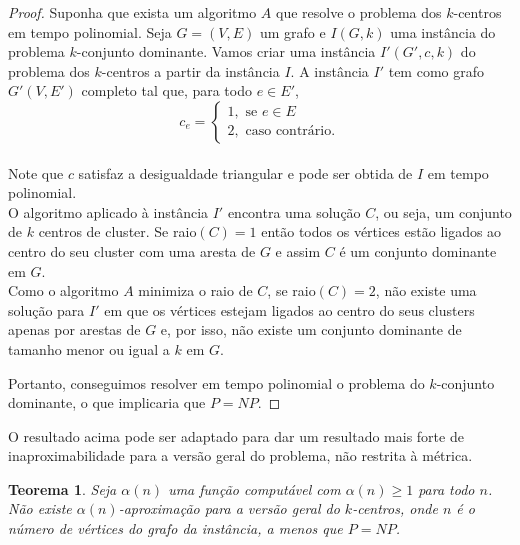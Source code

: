 \documentclass[12pt]{article}
\newtheorem{theorem}{Teorema}[section]
\newcommand{\NP}{\mathit{NP}}
\begin{document}
\begin{proof}
    Suponha que exista um algoritmo $A$ que resolve o problema dos $k$-centros em tempo polinomial. Seja $G = (V,E)$ um grafo e $I(G,k)$ uma instância do problema $k$-conjunto dominante. Vamos criar uma instância $I'(G',c,k)$ do problema dos $k$-centros a partir da instância $I$. A instância $I'$ tem como grafo $G'(V,E')$ completo tal que, para todo $e \in E'$, \\
    \[
    c_e = \begin{cases}
            1, \text{ se } e \in E \\
            2, \text{ caso contrário.} 
            \end{cases}\]\\
    Note que $c$ satisfaz a desigualdade triangular e pode ser obtida de $I$ em tempo polinomial.\\
    O algoritmo aplicado à instância $I'$ encontra uma solução $C$, ou seja, um conjunto de $k$ centros de cluster. Se raio$(C)=1$ então todos os vértices estão ligados ao centro do seu cluster com uma aresta de $G$ e assim $C$ é um conjunto dominante em $G$. \\
    Como o algoritmo $A$ minimiza o raio de $C$, se raio$(C)=2$, não existe uma solução para $I'$ em que os vértices estejam ligados ao centro do seus clusters apenas por arestas de $G$ e, por isso, não existe um conjunto dominante de tamanho menor ou igual a $k$ em $G$.

    Portanto, conseguimos resolver em tempo polinomial o problema do $k$-conjunto dominante, o que implicaria que $P = \NP$.
\end{proof}

O resultado acima pode ser adaptado para dar um resultado mais forte de inaproximabilidade para a versão geral do problema, não restrita à métrica.
\begin{theorem}
    Seja $\alpha(n)$ uma função computável com $\alpha(n)\geq 1$ para todo $n$. Não existe $\alpha(n)$-aproximação para a versão geral do $k$-centros, onde $n$ é o número de vértices do grafo da instância, a menos que $P=\NP$.
\end{theorem}
\end{document}
